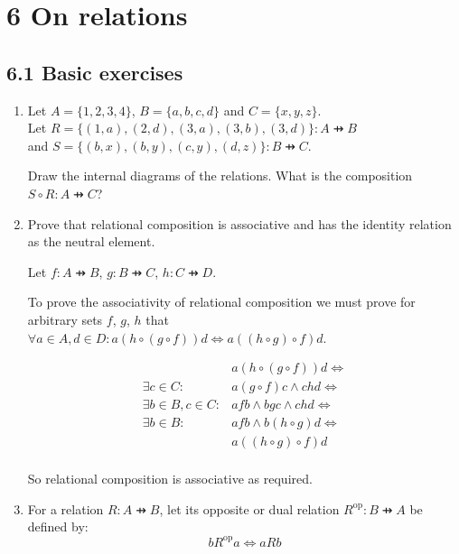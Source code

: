 \documentclass[10pt,\jkfside,a4paper]{article}
\begin{document}
\section*{6 On relations}

\subsection*{6.1 Basic exercises}

\begin{enumerate}

\item Let $A = \{1, 2, 3, 4\}$, $B = \{a, b, c, d\}$ and $C = \{x, y, z\}$.\\
Let $R = \{(1, a), (2, d), (3, a), (3, b), (3, d)\}: A \pfun B$\\
and $S = \{(b, x), (b, y), (c, y), (d, z)\}: B \pfun C$.

Draw the internal diagrams of the relations. What is the composition $S \circ R: A \pfun C$?



\item Prove that relational composition is associative and has the identity relation as the neutral element.

Let $f: A \pfun B$, $g: B \pfun C$, $h: C \pfun D$.

To prove the associativity of relational composition we must prove for arbitrary sets $f$, $g$, $h$ that 
$\forall a \in A, d \in D: a (h \circ (g \circ f)) d \Longleftrightarrow  a ((h \circ g) \circ f) d$.

\begin{equation}
\begin{split}
&a (h \circ (g \circ f)) d \Longleftrightarrow\\
\exists c \in C: &a (g \circ f) c \wedge c h d \Longleftrightarrow\\
\exists b \in B, c \in C: &a f b \wedge b g c \wedge c h d \Longleftrightarrow\\
\exists b \in B: & a f b \wedge b (h \circ g) d \Longleftrightarrow\\
&a ((h \circ g) \circ f) d \\
\end{split}
\end{equation}

So relational composition is associative as required.

\item For a relation $R: A \pfun B$, let its opposite or dual relation $R^{\text{op}}: B \pfun A$ be defined by:
\begin{equation}
b R^{\text{op}} a \Longleftrightarrow a R b
\end{equation}


\end{enumerate}
\end{document}
